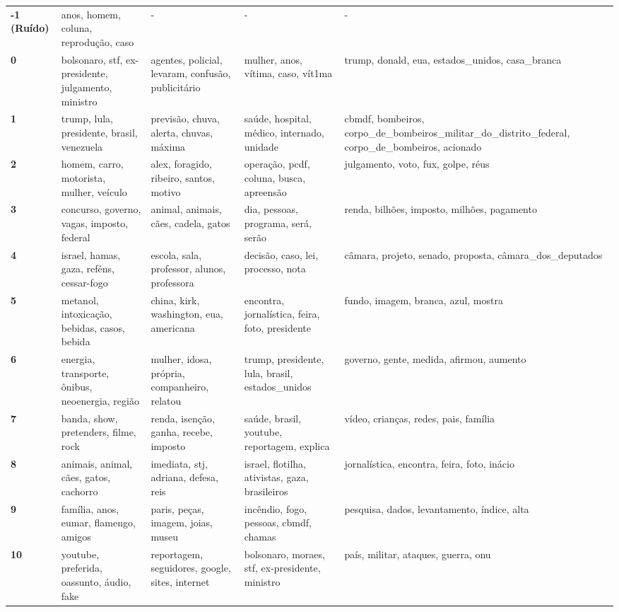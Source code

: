 \begin{xltabular}{\textwidth}{@{}l >{\RaggedRight\arraybackslash}X >{\RaggedRight\arraybackslash}X >{\RaggedRight\arraybackslash}X >{\RaggedRight\arraybackslash}X@{}}
    \textbf{-1 (Ruído)} & anos, homem, coluna, reprodução, caso & - & - & - \\
    \textbf{0} & bolsonaro, stf, ex-presidente, julgamento, ministro & agentes, policial, levaram, confusão, publicitário & mulher, anos, vítima, caso, vít1ma & trump, donald, eua, estados\_unidos, casa\_branca \\
    \textbf{1} & trump, lula, presidente, brasil, venezuela & previsão, chuva, alerta, chuvas, máxima & saúde, hospital, médico, internado, unidade & cbmdf, bombeiros, corpo\_de\_bombeiros\_militar\_do\_distrito\_federal, corpo\_de\_bombeiros, acionado \\
    \textbf{2} & homem, carro, motorista, mulher, veículo & alex, foragido, ribeiro, santos, motivo & operação, pcdf, coluna, busca, apreensão & julgamento, voto, fux, golpe, réus \\
    \textbf{3} & concurso, governo, vagas, imposto, federal & animal, animais, cães, cadela, gatos & dia, pessoas, programa, será, serão & renda, bilhões, imposto, milhões, pagamento \\
    \textbf{4} & israel, hamas, gaza, reféns, cessar-fogo & escola, sala, professor, alunos, professora & decisão, caso, lei, processo, nota & câmara, projeto, senado, proposta, câmara\_dos\_deputados \\
    \textbf{5} & metanol, intoxicação, bebidas, casos, bebida & china, kirk, washington, eua, americana & encontra, jornalística, feira, foto, presidente & fundo, imagem, branca, azul, mostra \\
    \textbf{6} & energia, transporte, ônibus, neoenergia, região & mulher, idosa, própria, companheiro, relatou & trump, presidente, lula, brasil, estados\_unidos & governo, gente, medida, afirmou, aumento \\
    \textbf{7} & banda, show, pretenders, filme, rock & renda, isenção, ganha, recebe, imposto & saúde, brasil, youtube, reportagem, explica & vídeo, crianças, redes, pais, família \\
    \textbf{8} & animais, animal, cães, gatos, cachorro & imediata, stj, adriana, defesa, reis & israel, flotilha, ativistas, gaza, brasileiros & jornalística, encontra, feira, foto, inácio \\
    \textbf{9} & família, anos, eumar, flamengo, amigos & paris, peças, imagem, joias, museu & incêndio, fogo, pessoas, cbmdf, chamas & pesquisa, dados, levantamento, índice, alta \\
    \textbf{10} & youtube, preferida, oassunto, áudio, fake & reportagem, seguidores, google, sites, internet & bolsonaro, moraes, stf, ex-presidente, ministro & país, militar, ataques, guerra, onu \\

\end{xltabular}
